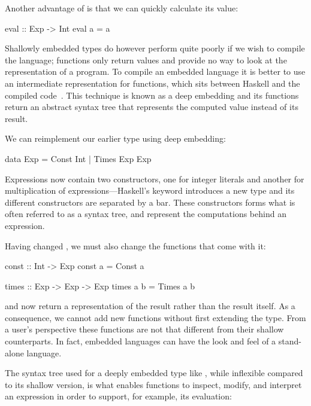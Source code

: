 \documentclass[../paper.tex]{subfiles}
\begin{document}
Another advantage of  is that we can quickly calculate its value:

\begin{code}
eval :: Exp -> Int
eval a = a
\end{code}

\noindent Shallowly embedded types do however perform quite poorly if we wish to compile the language; functions only return values and provide no way to look at the representation of a program. To compile an embedded language it is better to use an intermediate representation for functions, which sits between Haskell and the compiled code~\cite{elliott2003}. This technique is known as a deep embedding and its functions return an abstract syntax tree that represents the computed value instead of its result.

We can reimplement our earlier  type using deep embedding:

\begin{code}
data Exp = Const Int | Times Exp Exp
\end{code}

\noindent Expressions now contain two constructors, one for integer literals and another for multiplication of expressions---Haskell's  keyword introduces a new type and its different constructors are separated by a bar. These constructors forms what is often referred to as a syntax tree, and represent the computations behind an expression.

Having changed , we must also change the functions that come with it:

\begin{code}
const :: Int -> Exp
const a = Const a

times :: Exp -> Exp -> Exp
times a b = Times a b
\end{code}

\noindent {} and  now return a representation of the result rather than the result itself. As a consequence, we cannot add new functions without first extending the  type. From a user's perspective these functions are not that different from their shallow counterparts. In fact, embedded languages can have the look and feel of a stand-alone language.

The syntax tree used for a deeply embedded type like , while inflexible compared to its shallow version, is what enables functions to inspect, modify, and interpret an expression in order to support, for example, its evaluation:
\end{document}
